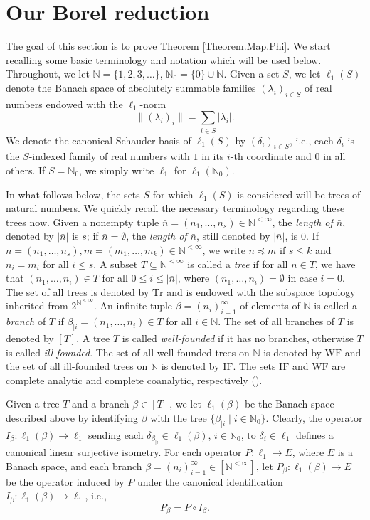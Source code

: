 \documentclass[letterpaper]{amsart}
\numberwithin{equation}{section}
\theoremstyle{definition}
\newcommand{\N}{{\mathbb{N}}}
\newcommand{\WF}{\mathrm{WF}}
\newcommand{\IF}{\mathrm{IF}}
\begin{document}
\section{Our Borel reduction}\label{SectionCompleteCoanalytic}

The goal of this section is to prove Theorem \ref{Theorem.Map.Phi}. We start recalling some basic terminology and notation which will be used below. Throughout, we let $\N=\{1,2, 3,\ldots\}$, $\N_0=\{0\}\cup \N$. Given a set $S$, we let $\ell_1(S)$ denote the Banach space of absolutely summable families $(\lambda_i)_{i\in S}$ of real numbers endowed with the $\ell_1$-norm \[\|(\lambda_i)_i\|=\sum_{i\in S}|\lambda_i|.\] We denote the canonical Schauder basis of $\ell_1(S)$ by $(\delta_{i})_{i\in S}$, i.e., each $\delta_i$ is the $S$-indexed family of real numbers with $1$ in its $i$-th coordinate and $0$ in all others. If $S=\N_0$, we simply write $\ell_1$ for $\ell_1(\N_0)$.  


In what follows below, the sets $S$ for which $\ell_1(S)$ is considered will be trees of natural numbers. We quickly recall the necessary terminology regarding these trees now.  Given a nonempty tuple $\bar n=(n_1,\ldots, n_s)\in \N^{<\infty}$, the \emph{length of $\bar n$}, denoted by $|\bar n|$ is $s$; if $\bar n=\emptyset$, the \emph{length of $\bar n$}, still denoted by $|\bar n|$, is $0$. If $\bar n=(n_1,\ldots, n_s),\bar m=(m_1,\ldots, m_k)\in \N^{<\infty}$, we write  $\bar n\preceq \bar m$ if $s\leq k$ and $n_i=m_i$ for all $i\leq s$. A subset  $T\subseteq \N^{<\infty}$ is called a  \emph{tree} if for all $\bar n\in T$, we have that $(n_1,\ldots, n_i)\in T$ for all $0\leq i\leq |\bar n|$, where    $(n_1,\ldots, n_i)=\emptyset$ in case  $i=0$.  The set of all trees is denoted by $\mathrm{Tr}$ and is endowed with the subspace topology inherited from $2^{\N^{<\infty}}$. An infinite tuple $\beta=(n_i)_{i=1}^\infty$ of elements of $\N$ is called a \emph{branch} of $T$ if $\beta_{|i}=(n_1,\ldots, n_i)\in T$ for all $i\in \N$. The set of all branches of $T$ is denoted by $[T]$. A tree $T$  is called \emph{well-founded} if it has no branches, otherwise $T$ is called \emph{ill-founded}. The set of all well-founded trees on $\N$ is denoted by $\WF$ and the set of all ill-founded trees on $\N$ is denoted by $\IF$. The sets $\IF$ and $\WF$ are complete analytic and complete coanalytic, respectively (\cite[Theorem 27.1]{KechrisBook1995}).


Given a tree $T$  and a branch $\beta \in [T]$, we let $\ell_1(\beta)$ be the Banach space described above by identifying $\beta$ with the tree $\{\beta_{|i}\mid i\in \N_0\}$. Clearly, the operator $I_\beta\colon \ell_1(\beta)\to \ell_1$ sending each  $\delta_{\beta_{|i}}\in \ell_1(\beta)$, $i\in \N_0$,  to  $\delta_i\in \ell_1$ defines a canonical linear surjective isometry. For each operator  $P\colon \ell_1\to E$, where $E$ is a  Banach space,  and each  branch $\beta=(n_i)_{i=1}^\infty\in [\N^{<\infty}]$, let $P_\beta\colon \ell_1(\beta)\to E$ be the operator  induced by $P$ under the  canonical identification $  I_\beta\colon \ell_1(\beta)\to \ell_1$, i.e., \begin{equation}\label{Eq.Pbeta}
P_\beta= P\circ I_\beta.\end{equation}
\end{document}
